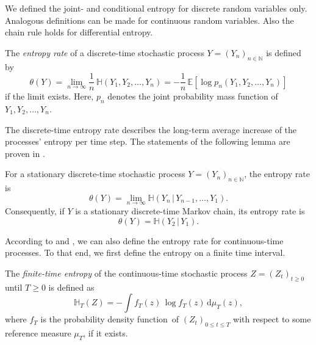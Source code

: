 \documentclass[smallextended]{svjour3}
\newcommand{\N}{\mathbb{N}}
\newcommand{\E}{\mathbb{E}}
\renewcommand{\H}{\mathbb{H}}
\newcommand{\liml}{\lim\limits}
\newcommand{\dd}[1]{\,\mathrm{d}#1}
\newcommand{\pdf}{probability density function}
\begin{document}
\begin{remark}
	We defined the joint- and conditional entropy for discrete random variables only.
	Analogous definitions can be made for continuous random variables.
	Also the chain rule holds for differential entropy.
\end{remark}

\begin{definition}%
\label{def:entropy_rate}
	The \emph{entropy rate} of a discrete-time stochastic process $Y=(Y_n)_{n\in \N}$ is defined by
	\begin{equation*}
		\theta(Y) = \liml_{n\to\infty} \frac{1}{n}\,\H(Y_1,Y_2,\ldots,Y_n) = -\frac{1}{n}\,\E\left[\log p_n(Y_1,Y_2,\ldots,Y_n)\right]
	\end{equation*}
	if the limit exists.
	Here, $p_n$ denotes the joint probability mass function of $Y_1,Y_2,\ldots,Y_n$.
\end{definition}

The discrete-time entropy rate describes the long-term average increase of the processes' entropy per time step.
The statements of the following lemma are proven in \citet[Theorem~4.2.1]{Cover2006}.

\begin{lemma}\label{lem:entropy_rate_st_MC}
	For a stationary discrete-time stochastic process $Y=(Y_n)_{n\in\N}$, the entropy rate is
	\begin{equation*}
		\theta(Y) = \liml_{n\to\infty} \H(Y_n\,|\,Y_{n-1},\ldots,Y_1).
	\end{equation*}
	Consequently, if $Y$ is a stationary discrete-time Markov chain, its entropy rate is
	\begin{equation*}
		\theta(Y) = \H(Y_2\,|\,Y_1).
	\end{equation*}
\end{lemma}

According to \citet{Dumitrescu1988MICAS} and \citet{Girardin2003JAP}, we can also define the entropy rate for continuous-time processes.
To that end, we first define the entropy on a finite time interval.

\begin{definition}%
	The \emph{finite-time entropy} of the continuous-time stochastic process $Z=(Z_t)_{t\geq0}$ until $T\geq0$ is defined as
	\begin{equation*}
		\H_T(Z) = - \int f_T(z)\,\log f_T(z)\dd{\mu_T(z)},	 
	\end{equation*}
	where $f_T$ is the \pdf\ of $(Z_t)_{0\leq t\leq T}$ with respect to some reference measure $\mu_T$, if it exists.
\end{definition}
\end{document}

